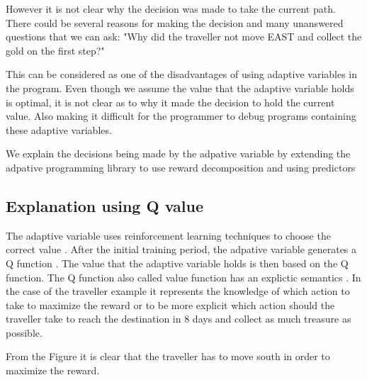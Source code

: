 \documentclass[conference]{IEEEtran}
\begin{document}
However it is not clear why the decision was made to take the current path. There could be several reasons
for making the decision and many unanswered questions that we can ask:
"Why did the traveller not move EAST and collect the gold on the first step?"

This can be considered as one of the disadvantages of using adaptive variables in the program.
Even though we assume the value that the adaptive variable holds is optimal, it is not clear as to why
it made the decision to hold the current value. Also making it difficult for
the programmer to debug programs containing these adaptive variables.

We explain the decisions being made by the adpative variable by extending the adpative programming library
to use reward decomposition and using predictors


\subsection{Explanation using Q value}

The adaptive variable uses reinforcement learning techniques to choose the correct value \cite{bauer2011adaptation}.
After the initial training period, the adpative variable generates a Q function \cite{bauer2011adaptation}. The value
that the adaptive variable holds is then based on the Q function. The Q function also called value function has
an explictic semantics \cite{sutton2011horde}. In the case of the traveller example it represents the knowledge of
which action to take to maximize the reward or to be more explicit which action should the traveller take to reach the
destination in 8 days and collect as much treasure as possible.


From the Figure it is clear that the traveller has to move south in order to maximize the reward.
\end{document}
